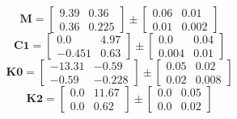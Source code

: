 \documentclass[../../report/parameterReport.tex]{subfiles}
\begin{document}
\begin{equation}
\mathbf{M}=
\left[
\begin{array}{rr}
    9.39 & 0.36\\
    0.36 & 0.225
\end{array}
\right]
\pm
\left[
\begin{array}{rr}
    0.06 & 0.01\\
    0.01 & 0.002
\end{array}
\right]
\label{eq:M}
\end{equation}
\begin{equation}
\mathbf{C1}=
\left[
\begin{array}{rr}
    0.0 & 4.97\\
    -0.451 & 0.63
\end{array}
\right]
\pm
\left[
\begin{array}{rr}
    0.0 & 0.04\\
    0.004 & 0.01
\end{array}
\right]
\label{eq:C1}
\end{equation}
\begin{equation}
\mathbf{K0}=
\left[
\begin{array}{rr}
    -13.31 & -0.59\\
    -0.59 & -0.228
\end{array}
\right]
\pm
\left[
\begin{array}{rr}
    0.05 & 0.02\\
    0.02 & 0.008
\end{array}
\right]
\label{eq:K0}
\end{equation}
\begin{equation}
\mathbf{K2}=
\left[
\begin{array}{rr}
    0.0 & 11.67\\
    0.0 & 0.62
\end{array}
\right]
\pm
\left[
\begin{array}{rr}
    0.0 & 0.05\\
    0.0 & 0.02
\end{array}
\right]
\label{eq:K2}
\end{equation}
\end{document}
